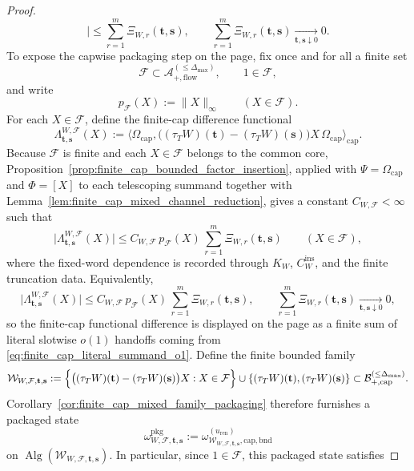 \begin{proof}
\[\big|
\le
\sum_{r=1}^m \Xi_{W,r}(\mathbf t,\mathbf s),
\qquad
\sum_{r=1}^m \Xi_{W,r}(\mathbf t,\mathbf s)
\xrightarrow[\mathbf t,\mathbf s\downarrow 0]{}0.
\]
To expose the capwise packaging step on the page, fix once and for all a finite set
\[
\mathcal F\subset \mathcal A_{+,\mathrm{flow}}^{(\le \Delta_{\max})},
\qquad
1\in\mathcal F,
\]
and write
\[
p_{\mathcal F}(X):=\|X\|_\infty
\qquad
(X\in \mathcal F).
\]
For each $X\in\mathcal F$, define the finite-cap difference functional
\[
\Lambda^{W,\mathcal F}_{\mathbf t,\mathbf s}(X)
:=
\big\langle
\Omega_{\mathrm{cap}},
\bigl((\tau_T W)(\mathbf t)-(\tau_T W)(\mathbf s)\bigr)X\,\Omega_{\mathrm{cap}}
\big\rangle_{\mathrm{cap}}.
\]
Because $\mathcal F$ is finite and each $X\in\mathcal F$ belongs to the common core, Proposition~\ref{prop:finite_cap_bounded_factor_insertion}, applied with $\Psi=\Omega_{\mathrm{cap}}$ and $\Phi=[X]$ to each telescoping summand together with Lemma~\ref{lem:finite_cap_mixed_channel_reduction}, gives a constant $C_{W,\mathcal F}<\infty$ such that
\[
\bigl|\Lambda^{W,\mathcal F}_{\mathbf t,\mathbf s}(X)\bigr|
\le
C_{W,\mathcal F}\,p_{\mathcal F}(X)\,
\sum_{r=1}^m \Xi_{W,r}(\mathbf t,\mathbf s)
\qquad
(X\in\mathcal F),
\]
where the fixed-word dependence is recorded through $K_W$, $C_W^{\mathrm{ins}}$, and the finite truncation data.
Equivalently,
\begin{equation}\label{eq:finite_cap_flowed_sector_bridge_lambda_o1}
\bigl|\Lambda^{W,\mathcal F}_{\mathbf t,\mathbf s}(X)\bigr|
\le
C_{W,\mathcal F}\,p_{\mathcal F}(X)\,
\sum_{r=1}^m \Xi_{W,r}(\mathbf t,\mathbf s),
\qquad
\sum_{r=1}^m \Xi_{W,r}(\mathbf t,\mathbf s)
\xrightarrow[\mathbf t,\mathbf s\downarrow 0]{}0,
\end{equation}
so the finite-cap functional difference is displayed on the page as a finite sum of literal slotwise $o(1)$ handoffs coming from \eqref{eq:finite_cap_literal_summand_o1}.
Define the finite bounded family
\[
\mathcal W_{W,\mathcal F,\mathbf t,\mathbf s}
:=
\Bigl\{
\bigl((\tau_T W)(\mathbf t)-(\tau_T W)(\mathbf s)\bigr)X
:
X\in\mathcal F
\Bigr\}
\cup
\{(\tau_T W)(\mathbf t),(\tau_T W)(\mathbf s)\}
\subset
\mathcal B_{+,\mathrm{cap}}^{(\le \Delta_{\max})}.
\]
Corollary~\ref{cor:finite_cap_mixed_family_packaging} therefore furnishes a packaged state
\[
\omega_{W,\mathcal F,\mathbf t,\mathbf s}^{\mathrm{pkg}}
:=
\omega_{\mathcal W_{W,\mathcal F,\mathbf t,\mathbf s},\mathrm{cap,bnd}}^{(u_{\mathrm{ren}})}
\]
on $\operatorname{Alg}(\mathcal W_{W,\mathcal F,\mathbf t,\mathbf s})$.
In particular, since $1\in\mathcal F$, this packaged state satisfies

\end{proof}
